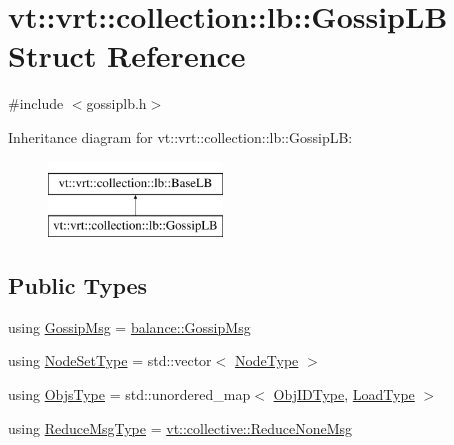 \hypertarget{structvt_1_1vrt_1_1collection_1_1lb_1_1_gossip_l_b}{}\section{vt\+:\+:vrt\+:\+:collection\+:\+:lb\+:\+:Gossip\+LB Struct Reference}
\label{structvt_1_1vrt_1_1collection_1_1lb_1_1_gossip_l_b}


{\ttfamily \#include $<$gossiplb.\+h$>$}

Inheritance diagram for vt\+:\+:vrt\+:\+:collection\+:\+:lb\+:\+:Gossip\+LB\+:\begin{figure}[H]
\begin{center}
\leavevmode
\includegraphics[height=2.000000cm]{structvt_1_1vrt_1_1collection_1_1lb_1_1_gossip_l_b}
\end{center}
\end{figure}
\subsection*{Public Types}
\begin{DoxyCompactItemize}
\item 
using \hyperlink{structvt_1_1vrt_1_1collection_1_1lb_1_1_gossip_l_b_af7170ae946da8af68105109f04824f03}{Gossip\+Msg} = \hyperlink{structvt_1_1vrt_1_1collection_1_1balance_1_1_gossip_msg}{balance\+::\+Gossip\+Msg}
\item 
using \hyperlink{structvt_1_1vrt_1_1collection_1_1lb_1_1_gossip_l_b_abb53f1d4bd3c37f3e68c3b5b0e1f1c86}{Node\+Set\+Type} = std\+::vector$<$ \hyperlink{namespacevt_a866da9d0efc19c0a1ce79e9e492f47e2}{Node\+Type} $>$
\item 
using \hyperlink{structvt_1_1vrt_1_1collection_1_1lb_1_1_gossip_l_b_ad2093cf08cc6af0f3deb4441e40c55a9}{Objs\+Type} = std\+::unordered\+\_\+map$<$ \hyperlink{structvt_1_1vrt_1_1collection_1_1lb_1_1_base_l_b_a15a2f756b59c8c2437985206b32aa403}{Obj\+I\+D\+Type}, \hyperlink{structvt_1_1vrt_1_1collection_1_1lb_1_1_base_l_b_a215e22b9f12678303f49615ae3be05cc}{Load\+Type} $>$
\item 
using \hyperlink{structvt_1_1vrt_1_1collection_1_1lb_1_1_gossip_l_b_ad251f887a319f433771b084187ef6089}{Reduce\+Msg\+Type} = \hyperlink{namespacevt_1_1collective_aa439a90f05078f2bcf918641c951946f}{vt\+::collective\+::\+Reduce\+None\+Msg}
\end{DoxyCompactItemize}
